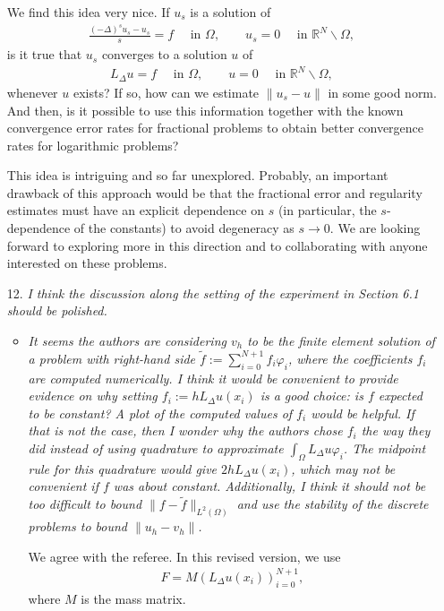 \documentclass[11 pt]{article}
\numberwithin{equation}{section}
\def\tilde{\widetilde}
\def\R{\mathbb{R}}
\begin{document}
\begin{enumerate}
    We find this idea very nice.  If $u_s$ is a solution of
    \begin{align*}
     \frac{(-\Delta)^s u_s - u_s}{s}=f\quad \text{ in }\Omega,\qquad u_s=0\quad \text{ in }\R^N\backslash \Omega,
    \end{align*}
 is it true that $u_s$ converges to a solution $u$ of
  \begin{align*}
     L_\Delta u = f\quad \text{ in }\Omega,\qquad u=0\quad \text{ in }\R^N\backslash \Omega,
    \end{align*}
whenever $u$ exists?     If so, how can we estimate $\|u_s-u\|$ in some good norm.  And then, is it possible to use this information together with the known convergence error rates for fractional problems to obtain better convergence rates for logarithmic problems?

This idea is intriguing and so far unexplored.  Probably, an important drawback of this approach would be that the fractional error and regularity estimates must have an explicit dependence on $s$ (in particular, the $s$-dependence of the constants) to avoid degeneracy as $s\to 0$. We are looking forward to exploring more in this direction and to collaborating with anyone interested on these problems.

    \item[12.] \emph{I think the discussion along the setting of the experiment in Section 6.1 should be polished.}
    \begin{itemize}
        \item \emph{It seems the authors are considering \(v_{h}\) to be the finite element solution of a problem with right-hand side \(\tilde{f}:=\sum_{i=0}^{N+1}f_{i}\varphi_{i}\), where the coefficients \(f_{i}\) are computed numerically. I think it would be convenient to provide evidence on why setting \(f_{i}:=hL_{\Delta}u(x_{i})\) is a good choice: is \(f\) expected to be constant? A plot of the computed values of \(f_{i}\) would be helpful. If that is not the case, then I wonder why the authors chose \(f_{i}\) the way they did instead of using quadrature to approximate \(\int_{\Omega}L_{\Delta}u\varphi_{i}\). The midpoint rule for this quadrature would give \(2hL_{\Delta}u(x_{i})\), which may not be convenient if \(f\) was about constant. Additionally, I think it should not be too difficult to bound \(\|f-\tilde{f}\|_{L^{2}(\Omega)}\) and use the stability of the discrete problems to bound \(\|u_{h}-v_{h}\|\).}


        We agree with the referee. In this revised version, we use
\begin{align*}
 F = M  (L_\Delta u(x_i))_{i=0}^{N+1},
\end{align*}
where $M$ is the mass matrix.


\end{itemize}
\end{enumerate}
\end{document}
